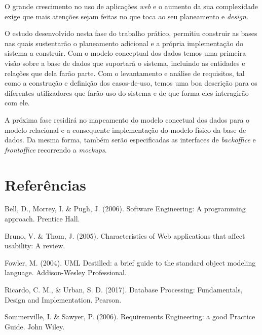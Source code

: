 \documentclass[a4paper,12pt]{report}
\begin{document}
	O grande crescimento no uso de aplicações \textit{web} e o aumento da sua complexidade exige que mais atenções sejam feitas no que toca ao seu planeamento e \textit{design}.
	
	O estudo desenvolvido nesta fase do trabalho prático, permitiu construir as bases nas quais sustentarão o planeamento adicional e a própria implementação do sistema a construir. Com o modelo conceptual dos dados temos uma primeira visão sobre a base de dados que suportará o sistema, incluindo as entidades e relações que dela farão parte. Com o levantamento e análise de requisitos, tal como a construção e definição dos casos-de-uso, temos uma boa descrição para os diferentes utilizadores que farão uso do sistema e de que forma eles interagirão com ele. 
	
	A próxima fase residirá no mapeamento do modelo concetual dos dados para o modelo relacional e a consequente implementação do modelo físico da base de dados. Da mesma forma, também serão especificadas as interfaces de \textit{backoffice} e \textit{frontoffice} recorrendo a \textit{mockups}.

\titleformat{\chapter}[display]
{\normalfont\bfseries}{}{0pt}{\Huge}
\chapter{Referências}

Bell, D., Morrey, I. \& Pugh, J. (2006). Software Engineering: A programming approach. Prentice Hall.

Bruno, V. \& Thom, J. (2005). Characteristics of Web applications that affect usability: A review. 

Fowler, M. (2004). UML Destilled: a brief guide to the standard object modeling language. Addison-Wesley Professional.

Ricardo, C. M., \& Urban, S. D. (2017). Database Processing: Fundamentals, Design and Implementation. Pearson.

Sommerville, I. \& Sawyer, P. (2006). Requirements Engineering: a good Practice Guide. John Wiley.


	
\end{document}
